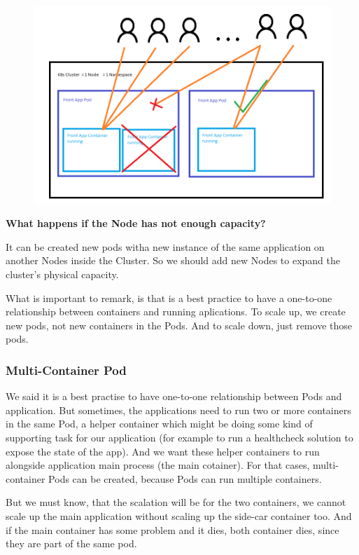 \documentclass{article}
\newenvironment{blocktemplate}[1]{%
    \tcolorbox[beamer,%
    noparskip,breakable,
    colframe=Blue,%
    colbacklower=LimeGreen!75!LightGreen,%
    title=#1]}%
    {\endtcolorbox}
\begin{document}
\begin{figure}[H]
    \includegraphics[scale=0.5]{pictures/image3.png}
\end{figure}

\textbf{What happens if the Node has not enough capacity?}

It can be created new pods witha new instance of the same application on another Nodes inside the Cluster. So we should add new Nodes to expand the cluster's physical capacity.

\begin{blocktemplate}{Note}
What is important to remark, is that is a best practice to have a one-to-one relationship between containers and running aplications. To scale up, we create new pods, not new containers in the Pods. And to scale down, just remove those pods.
\end{blocktemplate}


\subsubsection{Multi-Container Pod}

We said it is a best practise to have one-to-one relationship between Pods and application. But sometimes, the applications need to run two or more containers in the same Pod, a helper container which might be doing some kind of supporting task for our application (for example to run a healthcheck solution to expose the state of the app). And we want these helper containers to run alongside application main process (the main cotainer). For that cases, multi-container Pods can be created, because Pods can run multiple containers.

But we must know, that the scalation will be for the two containers, we cannot scale up the main application without scaling up the side-car container too. And if the main container has some problem and it dies, both container dies, since they are part of the same pod.
\end{document}

